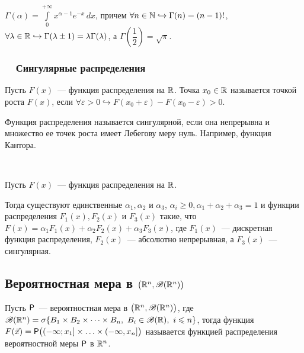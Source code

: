 \begin{definition}
	$\Gamma(\alpha) = \int\limits_0^{+\infty} x^{\alpha - 1} e^{-x} \, d x$, причем $\forall n \in \N \hookrightarrow \Gamma(n) = (n - 1)!$, $\forall \lambda \in \R \hookrightarrow \Gamma(\lambda \pm 1) = \lambda \Gamma(\lambda)$, а $\Gamma\left(\dfrac{1}{2}\right) = \sqrt{\pi}$.
\end{definition}

\subsubsection*{~~Сингулярные распределения}
\begin{definition}
	Пусть $F(x)$~--- функция распределения на $\R$. Точка $x_0 \in \R$ называется точкой роста $F(x)$, если $\forall \varepsilon > 0 \hookrightarrow F(x_0 + \varepsilon) - F(x_0 - \varepsilon) > 0$.
\end{definition}

\begin{definition}
	Функция распределения называется сингулярной, если она непрерывна и множество ее точек роста имеет Лебегову меру нуль. Например, функция Кантора.
\end{definition}
\begin{theorem}~

	Пусть $F(x)$~--- функция распределения на $\R$.
	
	Тогда существуют единственные $\alpha_1, \alpha_2$ и $\alpha_3$, $\alpha_i \geqslant 0, \alpha_1 + \alpha_2 + \alpha_3 = 1$ и функции распределения $F_1(x), F_2(x)$ и $F_3(x)$ такие, что $F(x) = \alpha_1 F_1(x) + \alpha_2 F_2(x) + \alpha_3 F_3(x)$, где $F_1(x)$~--- дискретная функция распределения, $F_2(x)$~--- абсолютно непрерывная, а $F_3(x)$~--- сингулярная. 
\end{theorem}

\subsection{Вероятностная мера в $\big( \R^n, \B(\R^n) \big)$}
\begin{definition}
	Пусть $\P$~--- вероятностная мера в $\big( \R^n, \B(\R^n) \big)$, где $\B(\R^n) = \sigma\{B_1 \times B_2 \times \dots \times B_n,\ B_i \in \B(\R),\ i \leqslant n \}$, тогда функция $F(\vec x) = \P\big((-\infty; x_1] \times \ldots \times (-\infty, x_n]\big)$ называется функцией распределения вероятностной меры $\P$ в $\R^n$.
\end{definition}

